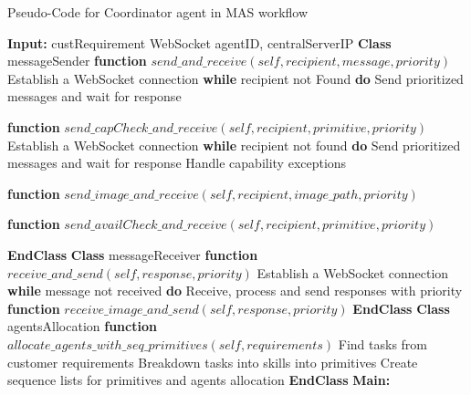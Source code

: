    
\begin{algorithm}
\caption{Pseudo-Code for Coordinator agent in MAS workflow}
\label{alg:CDAPseudoCode}
\begin{algorithmic}[1]
\State \textbf{Input:} custRequirement
 WebSocket
 agentID, centralServerIP
\State \textbf{Class} messageSender
    \State \textbf{\qquad function} {$send\_and\_receive(self, recipient, message, priority)$}
    \State \qquad \qquad Establish a WebSocket connection    
    \State \textbf{\qquad \qquad while} recipient not Found \textbf{do}    
    \State \qquad \qquad \qquad Send prioritized messages and wait for response

    \State \textbf{\qquad function} {$send\_capCheck\_and\_receive(self, recipient, primitive, priority)$}
    \State \qquad \qquad Establish a WebSocket connection
    \State \textbf{\qquad \qquad while} recipient not found \textbf{do} 
    \State \qquad \qquad \qquad Send prioritized messages and wait for response
    \State \qquad \qquad \qquad Handle capability exceptions

    \State \textbf{\qquad function} {$send\_image\_and\_receive(self, recipient, image\_path, priority)$}
    \State \qquad {}    

    \State \textbf{\qquad function} {$send\_availCheck\_and\_receive(self, recipient, primitive, priority)$}
    \State \qquad {} 

\State \textbf{EndClass}
\State \textbf{Class} messageReceiver
    \State \textbf{\qquad function} {$receive\_and\_send(self, response, priority)$}
    \State \qquad \qquad Establish a WebSocket connection
    \State \textbf{\qquad \qquad while} message not received \textbf{do}
    \State \qquad \qquad \qquad Receive, process and send responses with priority
    \State \textbf{\qquad function} {$receive\_image\_and\_send(self, response, priority)$}
    \State \qquad {}    
    \State \textbf{EndClass}
\State \textbf{Class} agentsAllocation
    \State \textbf{\qquad function} {$allocate\_agents\_with\_seq\_primitives(self, requirements)$}
    \State \qquad \qquad Find tasks from customer requirements
    \State \qquad \qquad Breakdown tasks into skills into primitives
    \State \qquad \qquad Create sequence lists for primitives and agents allocation    
\State \textbf{EndClass}
\State \textbf{Main:}


\end{algorithmic}
\end{algorithm}
